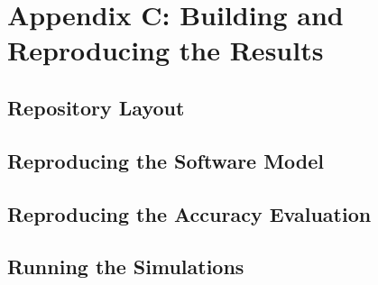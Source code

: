 %
\chapter*{Appendix C: Building and Reproducing the Results}
\label{appendix:reproduction}

\section{Repository Layout}
\label{sec:repo-layout}

\section{Reproducing the Software Model}
\label{sec:repro-sw}

\section{Reproducing the Accuracy Evaluation}
\label{sec:repro-accuracy}

\section{Running the Simulations}
\label{sec:repro-sim}

